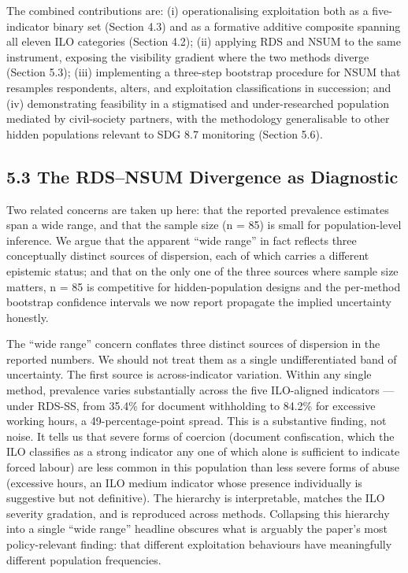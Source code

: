 \documentclass[
  12pt,
  letterpaper,
  DIV=11,
  numbers=noendperiod]{scrartcl}
\begin{document}
The combined contributions are: (i) operationalising exploitation both
as a five-indicator binary set (Section 4.3) and as a formative additive
composite spanning all eleven ILO categories (Section 4.2); (ii)
applying RDS and NSUM to the same instrument, exposing the visibility
gradient where the two methods diverge (Section 5.3); (iii) implementing
a three-step bootstrap procedure for NSUM that resamples respondents,
alters, and exploitation classifications in succession; and (iv)
demonstrating feasibility in a stigmatised and under-researched
population mediated by civil-society partners, with the methodology
generalisable to other hidden populations relevant to SDG 8.7 monitoring
(Section 5.6).

\subsection{5.3 The RDS--NSUM Divergence as
Diagnostic}\label{the-rdsnsum-divergence-as-diagnostic}

Two related concerns are taken up here: that the reported prevalence
estimates span a wide range, and that the sample size (n = 85) is small
for population-level inference. We argue that the apparent ``wide
range'' in fact reflects three conceptually distinct sources of
dispersion, each of which carries a different epistemic status; and that
on the only one of the three sources where sample size matters, n = 85
is competitive for hidden-population designs and the per-method
bootstrap confidence intervals we now report propagate the implied
uncertainty honestly.

The ``wide range'' concern conflates three distinct sources of
dispersion in the reported numbers. We should not treat them as a single
undifferentiated band of uncertainty. The first source is
across-indicator variation. Within any single method, prevalence varies
substantially across the five ILO-aligned indicators --- under RDS-SS,
from 35.4\% for document withholding to 84.2\% for excessive working
hours, a 49-percentage-point spread. This is a substantive finding, not
noise. It tells us that severe forms of coercion (document confiscation,
which the ILO classifies as a strong indicator any one of which alone is
sufficient to indicate forced labour) are less common in this population
than less severe forms of abuse (excessive hours, an ILO medium
indicator whose presence individually is suggestive but not definitive).
The hierarchy is interpretable, matches the ILO severity gradation, and
is reproduced across methods. Collapsing this hierarchy into a single
``wide range'' headline obscures what is arguably the paper's most
policy-relevant finding: that different exploitation behaviours have
meaningfully different population frequencies.
\end{document}
